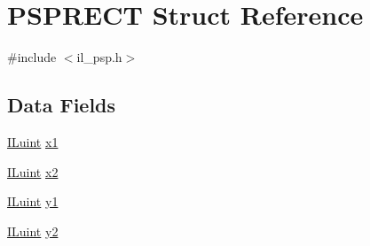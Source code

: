 \hypertarget{struct_p_s_p_r_e_c_t}{\section{P\-S\-P\-R\-E\-C\-T Struct Reference}
\label{struct_p_s_p_r_e_c_t}
}


{\ttfamily \#include $<$il\-\_\-psp.\-h$>$}

\subsection*{Data Fields}
\begin{DoxyCompactItemize}
\item 
\hyperlink{il_8h_ac6508d0e9c19e32f32e00d54b5b8cf30}{I\-Luint} \hyperlink{struct_p_s_p_r_e_c_t_a66a90885c014c3dc68c9f9dd1e9c6c38}{x1}
\item 
\hyperlink{il_8h_ac6508d0e9c19e32f32e00d54b5b8cf30}{I\-Luint} \hyperlink{struct_p_s_p_r_e_c_t_a78f3fc154228f9ee0311d37c443ffebb}{x2}
\item 
\hyperlink{il_8h_ac6508d0e9c19e32f32e00d54b5b8cf30}{I\-Luint} \hyperlink{struct_p_s_p_r_e_c_t_ade1fcf69431541dd81f258cf4908dc2f}{y1}
\item 
\hyperlink{il_8h_ac6508d0e9c19e32f32e00d54b5b8cf30}{I\-Luint} \hyperlink{struct_p_s_p_r_e_c_t_a8ead91f87da3835544e63fe192278608}{y2}
\end{DoxyCompactItemize}


